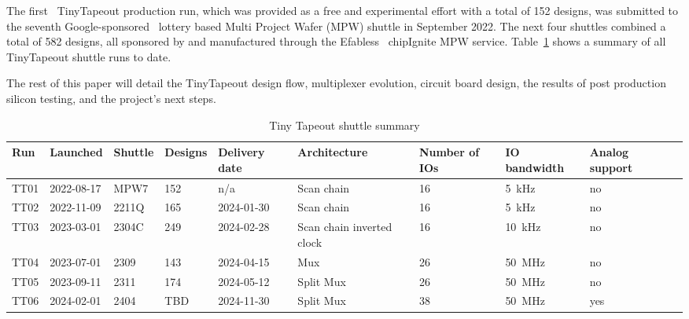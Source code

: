 The first~\cite{firstshuttle} TinyTapeout production run, which was provided as a free and experimental effort with a total of 152 designs, was submitted to the seventh Google-sponsored~\cite{googlesponsored} lottery based Multi Project Wafer (MPW) shuttle in September 2022.
The next four shuttles combined a total of 582 designs, all sponsored by and manufactured through the Efabless~\cite{efabless} chipIgnite MPW service. Table~\ref{tab:tinytapeout} shows a summary of all TinyTapeout shuttle runs to date.

The rest of this paper will detail the TinyTapeout design flow, multiplexer evolution, circuit board design, the results of post production silicon testing, and the project's next steps.

\begin{table}[!t]
\centering
\caption{Tiny Tapeout shuttle summary}
\label{tab:tinytapeout}
\begin{tabularx}{\textwidth}{@{}l *{9}{X}@{}}
\toprule
\textbf{Run} & \textbf{Launched} & \textbf{Shuttle} & \textbf{Designs} & \textbf{Delivery date} & \textbf{Architecture} & \textbf{Number of IOs} & \textbf{IO bandwidth} & \textbf{Analog support} \\
\midrule
TT01 & 2022-08-17  & MPW7  & 152 & n/a        & Scan chain                & 16 & \qty{5}{\kHz}    & no  \\
TT02 & 2022-11-09  & 2211Q & 165 & 2024-01-30 & Scan chain                & 16 & \qty{5}{\kHz}    & no  \\
TT03 & 2023-03-01  & 2304C & 249 & 2024-02-28 & Scan chain inverted clock & 16 & \qty{10}{\kHz}    & no  \\
TT04 & 2023-07-01  & 2309  & 143 & 2024-04-15 & Mux                       & 26 & \qty{50}{\MHz}   & no  \\
TT05 & 2023-09-11  & 2311  & 174 & 2024-05-12 & Split Mux                 & 26 & \qty{50}{\MHz}   & no  \\
TT06 & 2024-02-01  & 2404  & TBD & 2024-11-30 & Split Mux                 & 38 & \qty{50}{\MHz}   & yes \\
\bottomrule
\end{tabularx}
\end{table}


